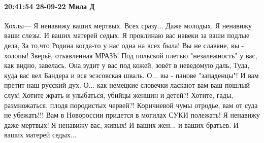 \paragraph{20:41:54 28-09-22 Мила Д}
Хохлы---
Я ненавижу ваших мертвых. Всех сразу... Даже молодых.
Я ненавижу ваши слезы. И ваших матерей седых.
Я проклинаю вас навеки за ваши подлые дела,
За то,что Родина когда-то у нас одна на всех была!
Вы не славяне, вы - холопы! Зверьё, отъявленная МРАЗЬ!
Под польской плетью "незалежность" у вас, как видно, завелась.
Она зудит у вас под кожей, зовёт в неведомую даль,
Туда, куда вас вел Бандера и вся эсэсовская шваль.
О... вы - панове "западенцы"! И вам претит наш русский дух.
О... как немецкие словечки ласкают вам ваш пошлый слух!
Хотите жрать и улыбаться, убийцы женщин и детей?!
Хотите, гады, размножаться, плодя породистых червей?!
Коричневой чумы отродье, вам от суда не убежать!!!
Вам в Новороссии придется в могилах СУКИ полежать!
Я ненавижу даже мертвых! Я ненавижу вас, живых!
И ваших жен... и ваших братьев. И ваших матерей седых...

